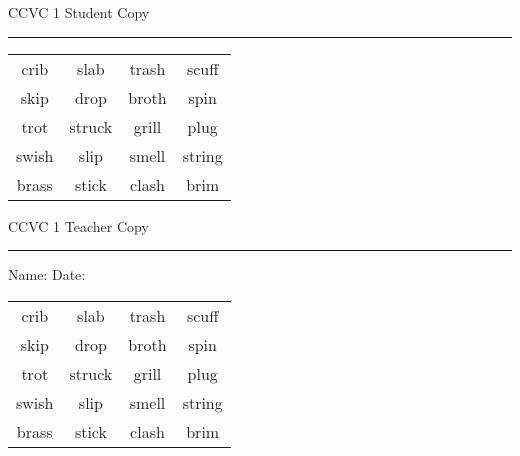 \documentclass{memoir}
\begin{document}

\footnotesize \noindent
CCVC 1 \hfill Student Copy
\smallskip
\hrule

\Large

\setlength{\tabcolsep}{14pt}
\def\arraystretch{3}

{\selectfont


\begin{vplace}[0.5]
\begin{center}
\begin{tabular}{cccc}
crib & slab             & trash & scuff \\
skip & drop & broth    & spin \\
trot & struck & grill            & plug \\
swish & slip & smell & string \\
brass       & stick & clash            & brim      \\
\end{tabular}
\end{center}
\end{vplace}

}

\newpage

\footnotesize \noindent
CCVC 1 \hfill Teacher Copy
\smallskip
\hrule

\small

\vfill

\noindent
Name: \underline{\hspace{1.75in}} \hfill Date: \underline{\hspace{1in}}

\Large

{\selectfont


\begin{vplace}[0.5]
\begin{center}
\begin{tabular}{cccc}
crib & slab             & trash & scuff \\
skip & drop & broth    & spin \\
trot & struck & grill            & plug \\
swish & slip & smell & string \\
brass       & stick & clash            & brim      \\
\end{tabular}
\end{center}
\end{vplace}



}
\end{document}

